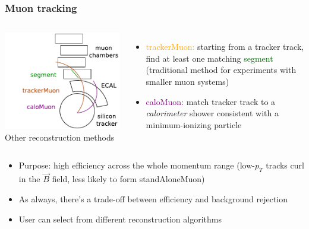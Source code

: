 \documentclass[compress]{beamer}
\begin{document}
\begin{frame}
\frametitle{Muon tracking}

\vspace{0.5 cm}
\begin{columns}
\includegraphics[width=\linewidth]{pieces2.pdf}
Other reconstruction methods

\begin{itemize}
\item \textcolor{orange}{trackerMuon:} starting from a tracker track,
  find at least one matching \textcolor{darkgreen}{segment}
  (traditional method for experiments with smaller muon systems)
\item \textcolor{purple}{caloMuon:} match tracker track to a {\it calorimeter} shower consistent with a
  minimum-ionizing particle
\end{itemize}
\end{columns}

\vfill
\begin{itemize}
\item Purpose: high efficiency across the whole momentum range
  (low-$p_T$ tracks curl in the $\vec{B}$ field, less likely to form standAloneMuon)
\item As always, there's a trade-off between efficiency and background rejection
\item User can select from different reconstruction algorithms
\end{itemize}
\end{frame}
\end{document}
